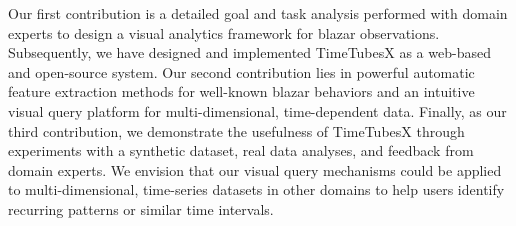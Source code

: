 Our first contribution is a detailed goal and task analysis performed with domain experts to design a visual analytics framework for blazar observations. 
Subsequently, we have designed and implemented TimeTubesX as a web-based and open-source system. 
Our second contribution lies in powerful automatic feature extraction methods for well-known blazar behaviors and an intuitive visual query platform for multi-dimensional, time-dependent data.
Finally, as our third contribution, we demonstrate the usefulness of TimeTubesX through experiments with a synthetic dataset, real data analyses, and feedback from domain experts.
We envision that our visual query mechanisms could be applied to multi-dimensional, time-series datasets in other domains to help users identify recurring patterns or similar time intervals.




